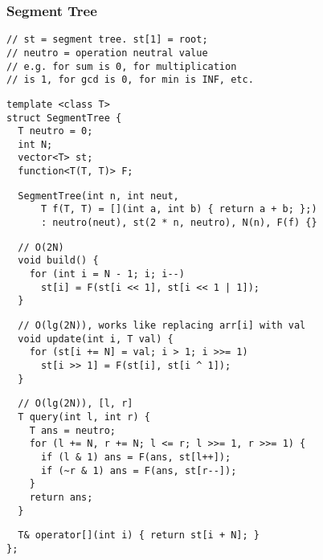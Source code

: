 \documentclass[twoside]{article}
\begin{document}
\begin{multicols*}{2}
\subsubsection*{Segment Tree}
\begin{verbatim}
// st = segment tree. st[1] = root;
// neutro = operation neutral value
// e.g. for sum is 0, for multiplication
// is 1, for gcd is 0, for min is INF, etc.
\end{verbatim}
\vspace{-12pt}
\begin{verbatim}
template <class T>
struct SegmentTree {
  T neutro = 0;
  int N;
  vector<T> st;
  function<T(T, T)> F;
\end{verbatim}
\vspace{-12pt}
\begin{verbatim}
  SegmentTree(int n, int neut,
      T f(T, T) = [](int a, int b) { return a + b; };)
      : neutro(neut), st(2 * n, neutro), N(n), F(f) {}
\end{verbatim}
\vspace{-12pt}
\begin{verbatim}
  // O(2N)
  void build() {
    for (int i = N - 1; i; i--)
      st[i] = F(st[i << 1], st[i << 1 | 1]);
  }
\end{verbatim}
\vspace{-12pt}
\begin{verbatim}
  // O(lg(2N)), works like replacing arr[i] with val
  void update(int i, T val) {
    for (st[i += N] = val; i > 1; i >>= 1)
      st[i >> 1] = F(st[i], st[i ^ 1]);
  }
\end{verbatim}
\vspace{-12pt}
\begin{verbatim}
  // O(lg(2N)), [l, r]
  T query(int l, int r) {
    T ans = neutro;
    for (l += N, r += N; l <= r; l >>= 1, r >>= 1) {
      if (l & 1) ans = F(ans, st[l++]);
      if (~r & 1) ans = F(ans, st[r--]);
    }
    return ans;
  }
\end{verbatim}
\vspace{-12pt}
\begin{verbatim}
  T& operator[](int i) { return st[i + N]; }
};
\end{verbatim}

\subsubsectionfont{\large\bfseries\sffamily\underline}

\end{multicols*}
\end{document}
